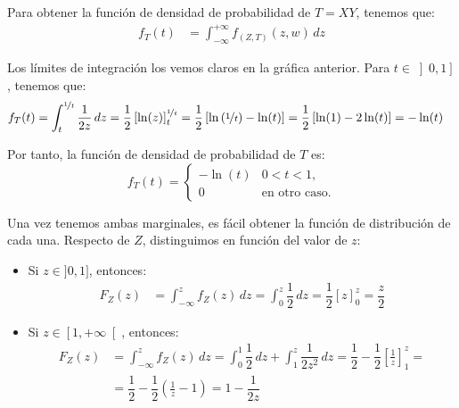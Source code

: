 \begin{ejercicio}
\begin{enumerate}
        Para obtener la función de densidad de probabilidad de $T=XY$, tenemos que:
        \begin{align*}
            f_{T}(t)&=\int_{-\infty}^{+\infty} f_{(Z,T)}(z, w) \, dz
        \end{align*}

        Los límites de integración los vemos claros en la gráfica anterior. Para $t\in \left]0,1\right]$, tenemos que:
        \begin{align*}
            f_T(t)&=\int_{t}^{\nicefrac{1}{t}} \dfrac{1}{2z} \, dz = \dfrac{1}{2}\left[\ln(z)\right]_{t}^{\nicefrac{1}{t}} = \dfrac{1}{2}\left[\ln\left(\nicefrac{1}{t}\right)-\ln(t)\right]
            = \dfrac{1}{2}\left[\ln(1)-2\ln(t)\right] = -\ln(t)
        \end{align*}

        Por tanto, la función de densidad de probabilidad de $T$ es:
        \begin{equation*}
            f_T(t) = \begin{cases}
                -\ln(t) & 0<t<1, \\
                0 & \text{en otro caso}.
            \end{cases}
        \end{equation*}

        Una vez tenemos ambas marginales, es fácil obtener la función de distribución de cada una.
        Respecto de $Z$, distinguimos en función del valor de $z$:
        \begin{itemize}
            \item Si $z\in ]0,1]$, entonces:
            \begin{align*}
                F_Z(z)&=\int_{-\infty}^{z} f_Z(z) \, dz = \int_{0}^{z} \dfrac{1}{2} \, dz = \dfrac{1}{2}\left[z\right]_{0}^{z} = \dfrac{z}{2}
            \end{align*}

            \item Si $z\in \left[1,+\infty\right[$, entonces:
            \begin{align*}
                F_Z(z)&=\int_{-\infty}^{z} f_Z(z) \, dz = \int_{0}^{1} \dfrac{1}{2} \, dz + \int_{1}^{z} \dfrac{1}{2z^2} \, dz
                = \dfrac{1}{2} - \dfrac{1}{2}\left[\frac{1}{z}\right]_{1}^{z}
                =\\&= \dfrac{1}{2} - \dfrac{1}{2}\left(\frac{1}{z}-1\right)
                = 1-\dfrac{1}{2z}
            \end{align*}        
        \end{itemize}


\end{enumerate}
\end{ejercicio}
